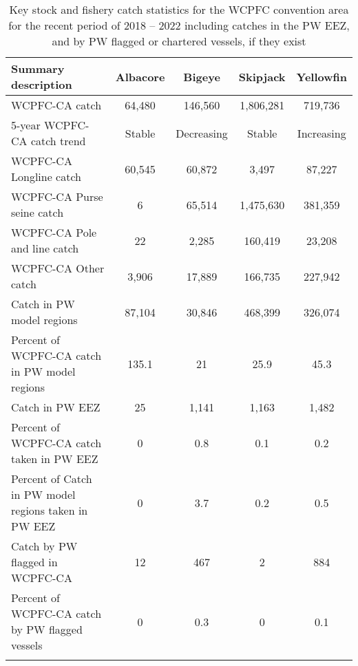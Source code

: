 \begin{longtable}{lcccc}
\caption{Key stock and fishery catch statistics for the WCPFC convention area for the recent period of 2018 -- 2022 including catches in the PW EEZ, and by PW flagged or chartered vessels, if they exist} \\ 
  \hline
Summary description & Albacore & Bigeye & Skipjack & Yellowfin \\ 
  \hline
WCPFC-CA catch & 64,480 & 146,560 & 1,806,281 & 719,736 \\ 
  5-year WCPFC-CA catch trend & Stable & Decreasing & Stable & Increasing \\ 
  WCPFC-CA Longline catch & 60,545 & 60,872 & 3,497 & 87,227 \\ 
  WCPFC-CA Purse seine catch & 6 & 65,514 & 1,475,630 & 381,359 \\ 
  WCPFC-CA Pole and line catch & 22 & 2,285 & 160,419 & 23,208 \\ 
  WCPFC-CA Other catch & 3,906 & 17,889 & 166,735 & 227,942 \\ 
  Catch in PW model regions & 87,104 & 30,846 & 468,399 & 326,074 \\ 
  Percent of WCPFC-CA catch in PW model regions & 135.1 & 21 & 25.9 & 45.3 \\ 
   \hline
Catch in PW EEZ & 25 & 1,141 & 1,163 & 1,482 \\ 
  Percent of WCPFC-CA catch taken in PW EEZ & 0 & 0.8 & 0.1 & 0.2 \\ 
  Percent of Catch in PW model regions taken in PW EEZ & 0 & 3.7 & 0.2 & 0.5 \\ 
  Catch by PW flagged in WCPFC-CA & 12 & 467 & 2 & 884 \\ 
  Percent of WCPFC-CA catch by PW flagged vessels & 0 & 0.3 & 0 & 0.1 \\ 
  \hline
\label{cat_sum_tab}
\end{longtable}
